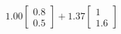 \documentclass[preview]{standalone}
\begin{document}
\begin{align*}
1.00 \begin{bmatrix} 0.8 \\ 0.5 \end{bmatrix} + 1.37 \begin{bmatrix} 1 \\ 1.6 \end{bmatrix}
\end{align*}
\end{document}
